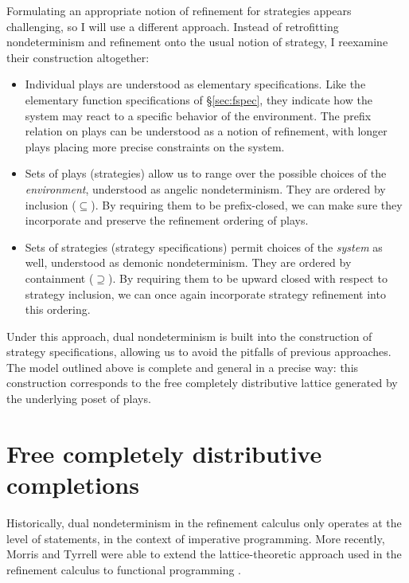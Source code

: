 \documentclass[11pt,oneside]{book}
\theoremstyle{definition}
\begin{document}
Formulating an appropriate notion of refinement
for strategies appears challenging,
so I will use a different approach.
Instead of retrofitting nondeterminism and refinement
onto the usual notion of strategy,
I reexamine their construction altogether:
\begin{itemize}
  \item Individual plays are understood as
    elementary specifications.
    Like the elementary function specifications of \S\ref{sec:fspec},
    they indicate how the system may react
    to a specific behavior of the environment.
    The prefix relation on plays
    can be understood as a notion of refinement,
    with longer plays placing more precise constraints
    on the system.
  \item Sets of plays (strategies)
    allow us to range over the possible choices of the \emph{environment},
    understood as angelic nondeterminism.
    They are ordered by inclusion ($\subseteq$).
    By requiring them to be prefix-closed,
    we can make sure they incorporate and preserve the refinement
    ordering of plays.
  \item Sets of strategies (strategy specifications)
    permit choices of the \emph{system} as well,
    understood as demonic nondeterminism.
    They are ordered by containment ($\supseteq$).
    By requiring them to be upward closed with respect to strategy inclusion,
    we can once again incorporate strategy refinement
    into this ordering.
\end{itemize}
Under this approach,
dual nondeterminism is built into
the construction of strategy specifications,
allowing us to avoid the pitfalls of previous approaches.
The model outlined above is complete and general
in a precise way:
this construction
corresponds to the free completely distributive lattice
generated by the underlying poset of plays.



\section{Free completely distributive completions} \label{sec:fcd} %

Historically,
dual nondeterminism in the refinement calculus
only operates at the level of statements,
in the context of imperative programming.
More recently,
Morris and Tyrrell were able to extend
the lattice-theoretic approach used in the refinement calculus
to functional programming
\citep{augtyp,dndf,cspdnd}.
\end{document}
